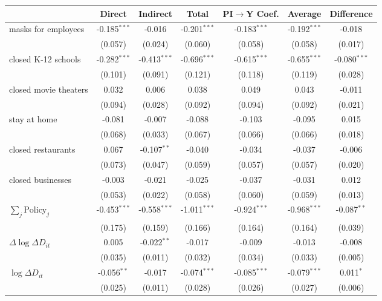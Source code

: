 
\begin{tabular}{lccccc|>{}c}
\toprule
  & Direct & Indirect & Total & PI$\to$Y Coef. & Average & Difference\\
\midrule
masks for employees & -0.185$^{***}$ & -0.016 & -0.201$^{***}$ & -0.183$^{***}$ & -0.192$^{***}$ & -0.018\\
 & (0.057) & (0.024) & (0.060) & (0.058) & (0.058) & (0.017)\\
closed K-12 schools & -0.282$^{***}$ & -0.413$^{***}$ & -0.696$^{***}$ & -0.615$^{***}$ & -0.655$^{***}$ & -0.080$^{***}$\\
 & (0.101) & (0.091) & (0.121) & (0.118) & (0.119) & (0.028)\\
closed movie theaters & 0.032 & 0.006 & 0.038 & 0.049 & 0.043 & -0.011\\
 & (0.094) & (0.028) & (0.092) & (0.094) & (0.092) & (0.021)\\
stay at home & -0.081 & -0.007 & -0.088 & -0.103 & -0.095 & 0.015\\
 & (0.068) & (0.033) & (0.067) & (0.066) & (0.066) & (0.018)\\
closed restaurants & 0.067 & -0.107$^{**}$ & -0.040 & -0.034 & -0.037 & -0.006\\
 & (0.073) & (0.047) & (0.059) & (0.057) & (0.057) & (0.020)\\
closed businesses & -0.003 & -0.021 & -0.025 & -0.037 & -0.031 & 0.012\\
 & (0.053) & (0.022) & (0.058) & (0.060) & (0.059) & (0.013)\\
$\sum_j \mathrm{Policy}_j$ & -0.453$^{***}$ & -0.558$^{***}$ & -1.011$^{***}$ & -0.924$^{***}$ & -0.968$^{***}$ & -0.087$^{**}$\\
 & (0.175) & (0.159) & (0.166) & (0.164) & (0.164) & (0.039)\\
$\Delta \log \Delta D_{it}$ & 0.005 & -0.022$^{**}$ & -0.017 & -0.009 & -0.013 & -0.008\\
 & (0.035) & (0.011) & (0.032) & (0.034) & (0.033) & (0.005)\\
$\log \Delta D_{it}$ & -0.056$^{**}$ & -0.017 & -0.074$^{***}$ & -0.085$^{***}$ & -0.079$^{***}$ & 0.011$^{*}$\\
 & (0.025) & (0.011) & (0.028) & (0.026) & (0.027) & (0.006)\\
\bottomrule
\end{tabular}